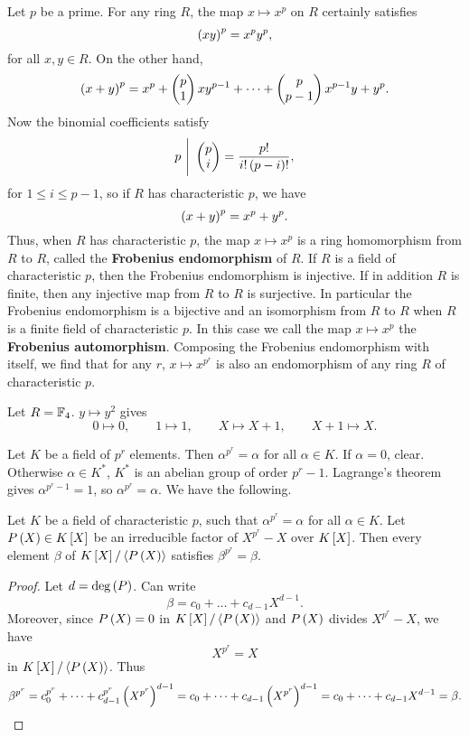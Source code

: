Let $ p $ be a prime. For any ring $ R $, the map $ x \mapsto x^p $ on $ R $ certainly satisfies
$$ \rb{xy}^p = x^py^p, $$
for all $ x, y \in R $. On the other hand,
$$ \rb{x + y}^p = x^p + \two{p}{1}xy^{p - 1} + \dots + \two{p}{p - 1}x^{p - 1}y + y^p. $$
Now the binomial coefficients satisfy
$$ p \ \Bigg| \ \two{p}{i} = \dfrac{p!}{i!\rb{p - i}!}, $$
for $ 1 \le i \le p - 1 $, so if $ R $ has characteristic $ p $, we have
$$ \rb{x + y}^p = x^p + y^p. $$
Thus, when $ R $ has characteristic $ p $, the map $ x \mapsto x^p $ is a ring homomorphism from $ R $ to $ R $, called the \textbf{Frobenius endomorphism} of $ R $. If $ R $ is a field of characteristic $ p $, then the Frobenius endomorphism is injective. If in addition $ R $ is finite, then any injective map from $ R $ to $ R $ is surjective. In particular the Frobenius endomorphism is a bijective and an isomorphism from $ R $ to $ R $ when $ R $ is a finite field of characteristic $ p $. In this case we call the map $ x \mapsto x^p $ the \textbf{Frobenius automorphism}. Composing the Frobenius endomorphism with itself, we find that for any $ r $, $ x \mapsto x^{p^r} $ is also an endomorphism of any ring $ R $ of characteristic $ p $.

\begin{example2}
Let $ R = \F_4 $. $ y \mapsto y^2 $ gives
$$ 0 \mapsto 0, \qquad 1 \mapsto 1, \qquad X \mapsto X + 1, \qquad X + 1 \mapsto X. $$
\end{example2}

Let $ K $ be a field of $ p^r $ elements. Then $ \alpha^{p^r} = \alpha $ for all $ \alpha \in K $. If $ \alpha = 0 $, clear. Otherwise $ \alpha \in K^* $, $ K^* $ is an abelian group of order $ p^r - 1 $. Lagrange's theorem gives $ \alpha^{p^r - 1} = 1 $, so $ \alpha^{p^r} = \alpha $. We have the following.

\begin{proposition}
Let $ K $ be a field of characteristic $ p $, such that $ \alpha^{p^r} = \alpha $ for all $ \alpha \in K $. Let $ P\rb{X} \in K\sb{X} $ be an irreducible factor of $ X^{p^r} - X $ over $ K\sb{X} $. Then every element $ \beta $ of $ K\sb{X} / \ab{P\rb{X}} $ satisfies $ \beta^{p^r} = \beta $.
\end{proposition}

\begin{proof}
Let $ d = \deg\rb{P} $. Can write
$$ \beta = c_0 + \dots + c_{d - 1}X^{d - 1}. $$
Moreover, since $ P\rb{X} = 0 $ in $ K\sb{X} / \ab{P\rb{X}} $ and $ P\rb{X} $ divides $ X^{p^r} - X $, we have
$$ X^{p^r} = X $$
in $ K\sb{X} / \ab{P\rb{X}} $. Thus
$$ \beta^{p^r} = c_0^{p^r} + \dots + c_{d - 1}^{p^r}\rb{X^{p^r}}^{d - 1} = c_0 + \dots + c_{d - 1}\rb{X^{p^r}}^{d - 1} = c_0 + \dots + c_{d - 1}X^{d - 1} = \beta. $$
\end{proof}

